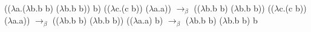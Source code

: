\documentclass{article}
\begin{document}
(($\lambda$a.($\lambda$b.b b) ($\lambda$b.b b)) b) (($\lambda$c.(c b)) ($\lambda$a.a)) $\to _\beta$ (($\lambda$b.b b) ($\lambda$b.b b)) (($\lambda$c.(c b)) ($\lambda$a.a)) $\to _\beta$
(($\lambda$b.b b) ($\lambda$b.b b)) (($\lambda$a.a) b) $\to _\beta$ ($\lambda$b.b b) ($\lambda$b.b b) b
\end{document}
